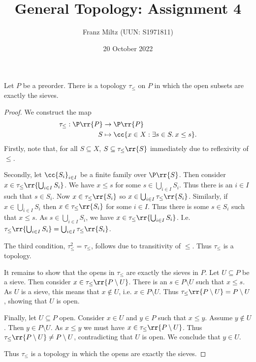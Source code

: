 \documentclass{article}
\begin{document}
\title{General Topology: Assignment 4}
\author{Franz Miltz (UUN: S1971811)}
\date{20 October 2022}
\maketitle

\begin{claim}
  Let $P$ be a preorder. There is a topology $\tau_\leq$ on $P$ in which the open subsets
  are exactly the sieves.
  \begin{proof}
    We construct the map
    \begin{align*}
      \tau_\leq : \P\rr{P}&\to\P\rr{P} \\
      S&\mapsto \cc{x\in X:\exists s\in S.\:x\leq s}.
    \end{align*}
    Firstly, note that, for all $S\subseteq X$, $S\subseteq \tau_\leq\rr{S}$ immediately due to
    reflexivity of $\leq$.

    Secondly, let $\cc{S_i}_{i\in I}$ be a finite family over $\P\rr{S}$. Then consider
    $x\in\tau_\leq\rr{\bigcup_{i\in I} S_i}$. We have $x\leq s$ for some $s\in\bigcup_{i\in I} S_i$.
    Thus there is an $i\in I$ such that $s\in S_i$. Now $x\in\tau_\leq\rr{S_i}$ so
    $x\in\bigcup_{i\in I}\tau_\leq\rr{S_i}$. Similarly, if $x\in\bigcup_{i\in I} S_i$ then
    $x\in\tau_\leq\rr{S_i}$ for some $i\in I$. Thus there is some $s\in S_i$ such that $x\leq s$.
    As $s\in\bigcup_{i\in I}S_i$, we have $x\in\tau_\leq\rr{\bigcup_{i\in I} S_i}$. I.e.
    $\tau_\leq\rr{\bigcup_{i\in I} S_i} = \bigcup_{i\in I} \tau_\leq\rr{S_i}$.

    The third condition, $\tau_\leq^2=\tau_\leq$, follows due to transitivity of $\leq$.
    Thus $\tau_\leq$ is a topology.

    It remains to show that the opens in $\tau_\leq$ are exactly the sieves in $P$.
    Let $U\subseteq P$ be a sieve. Then consider $x\in\tau_\leq\rr{P\setminus U}$.
    There is an $s\in P\setminus U$ such that $x\leq s$. As $U$ is a sieve, this means
    that $x\not\in U$, i.e. $x\in P\setminus U$. Thus $\tau_\leq\rr{P\setminus U}=P\setminus U$,
    showing that $U$ is open.

    Finally, let $U\subseteq P$ open. Consider $x\in U$ and $y\in P$ such that $x\leq y$.
    Assume $y\not\in U$. Then $y\in P\setminus U$. As $x\leq y$ we must have
    $x\in\tau_\leq\rr{P\setminus U}$. Thus $\tau_\leq\rr{P\setminus U}\neq P\setminus U$,
    contradicting that $U$ is open. We conclude that $y\in U$.

    Thus $\tau_\leq$ is a topology in which the opens are exactly the sieves.
  \end{proof}
\end{claim}
\end{document}

